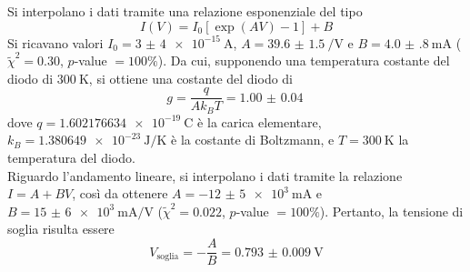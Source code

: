\documentclass[a4paper]{article}
\begin{document}
Si interpolano i dati tramite una relazione esponenziale del tipo
\[
I(V)=I_0 \left[ \exp\left( A V \right) -1 \right] + B
\] 
Si ricavano valori $I_0=\SI{3(4)e-15}{\A}$, $A=\SI{39.6(15)}{\per\volt}$ e $B=\SI{4.0(8)}{\mA}$ ($\widetilde{\chi}^2=0.30$, $p$-value $=100\%$). Da cui, supponendo una temperatura costante del diodo di $\SI{300}{\K}$, si ottiene una costante del diodo di
\[
g=\frac{q}{Ak_BT}=\SI{1.00(4)}{}
\] 
dove $q=\SI{1.602176634e-19}{\coulomb}$ è la carica elementare, $k_B=\SI{1.380649e-23}{\J\per\K}$ è la costante di Boltzmann, e $T=\SI{300}{\K}$ la temperatura del diodo.\\
Riguardo l'andamento lineare, si interpolano i dati tramite la relazione $I=A+BV$, così da ottenere $A=\SI{-12(5)e+3}{\mA}$ e $B=\SI{15(6)e+3}{\mA\per\V}$ ($\widetilde{\chi}^2=0.022$, $p$-value $=100\%$). Pertanto, la tensione di soglia risulta essere
\[
V_\text{soglia} = -\frac{A}{B}=\SI{0.793(9)}{\V}
\] 
\end{document}
